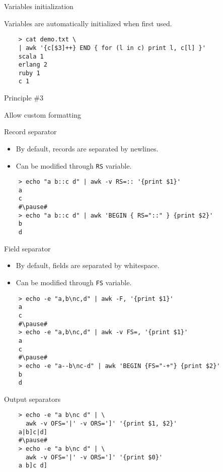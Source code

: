 \documentclass{beamer}
\renewcommand\big[1]{
  \begin{center}
    \Large{#1}
  \end{center}
}
\begin{document}
\begin{frame}[fragile]
  \big{Variables initialization}

  Variables are automatically initialized when first used.

  \begin{lstlisting}
    > cat demo.txt \
    | awk '{c[$3]++} END { for (l in c) print l, c[l] }'
    scala 1
    erlang 2
    ruby 1
    c 1
  \end{lstlisting}
\end{frame}

\begin{frame}
  \centering\Huge{Principle \#3}
  \big{Allow custom formatting}
\end{frame}

\begin{frame}[fragile]
  \big{Record separator}

  \begin{itemize}
    \item By default, records are separated by newlines.
    \item Can be modified through \texttt{RS} variable.
  \end{itemize}\pause

  \begin{lstlisting}
    > echo "a b::c d" | awk -v RS=:: '{print $1}'
    a
    c
    #\pause#
    > echo "a b::c d" | awk 'BEGIN { RS="::" } {print $2}'
    b
    d
  \end{lstlisting}
\end{frame}


\begin{frame}[fragile]
  \big{Field separator}

  \begin{itemize}
    \item By default, fields are separated by whitespace.
    \item Can be modified through \texttt{FS} variable.
  \end{itemize}\pause

  \begin{lstlisting}
    > echo -e "a,b\nc,d" | awk -F, '{print $1}'
    a
    c
    #\pause#
    > echo -e "a,b\nc,d" | awk -v FS=, '{print $1}'
    a
    c
    #\pause#
    > echo -e "a--b\nc-d" | awk 'BEGIN {FS="-+"} {print $2}'
    b
    d
  \end{lstlisting}
\end{frame}

\begin{frame}[fragile]
  \big{Output separators}

  \begin{lstlisting}
    > echo -e "a b\nc d" | \
      awk -v OFS='|' -v ORS=']' '{print $1, $2}'
    a|b]c|d]
    #\pause#
    > echo -e "a b\nc d" | \
      awk -v OFS='|' -v ORS=']' '{print $0}'
    a b]c d]
  \end{lstlisting}
\end{frame}
\end{document}
